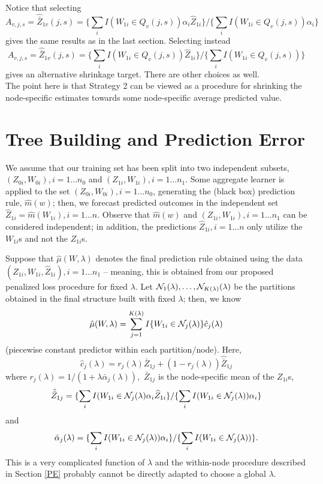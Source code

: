 \documentclass[12pt]{article}
\begin{document}
Notice that selecting
\[
A_{v,j,s} = \hat{\bar{Z}}_{1v}(j,s) =
\{ \sum_i I(W_{1i} \in Q_{v}(j,s)) \alpha_i  \hat{Z}_{1i} \}
/ \{ \sum_i I(W_{1i} \in Q_{v}(j,s)) \alpha_i \}
\]
gives the same results as in the last section. Selecting instead
\[
A_{v,j,s} = \hat{\bar{Z}}_{1v}(j,s) =
\{ \sum_i I(W_{1i} \in Q_{v}(j,s))  \hat{Z}_{1i} \}
/ \{ \sum_i I(W_{1i} \in Q_{v}(j,s))  \}
\]
gives an alternative shrinkage target.  There are other choices as well.\\

The point here is that Strategy 2 can be viewed as a procedure for
shrinking the node-specific estimates towards some node-specific
average predicted value.

\section{Tree Building and Prediction Error}
\label{PE-tree}

We assume that our training set has been split into two independent subsets,
$(Z_{0i},W_{0i}), i = 1 \ldots n_0$ and $(Z_{1i}, W_{1i}), i = 1
\ldots n_1$. Some aggregate learner is applied to 
the set $(Z_{0i}, W_{0i}), i = 1 \ldots
n_0$, generating the (black box) prediction rule, $\hat{m}(w)$; then,
we forecast predicted outcomes in the independent set $\widehat{Z}_{1i} =
\hat{m}(W_{1i}), i = 1 \ldots n$.  Observe that $\hat{m}(w)$ and
$(Z_{1i}, W_{1i}), i = 1 \ldots n_1$ can be considered independent; in
addition, the predictions $\widehat{Z}_{1i}, i = 1 \ldots n$ only
utilize the $W_{1i}$s and not the $Z_{1i}$s. 

Suppose that $\hat{\mu}(W,\lambda)$ denotes the final prediction
rule obtained using the data $(Z_{1i}, W_{1i}, \hat Z_{1i}), i = 1
\ldots n_1$ -- meaning, this is obtained from our proposed
penalized loss procedure for fixed $\lambda.$
Let ${\cal N}_1(\lambda), \ldots, {\cal N}_{K(\lambda)}(\lambda)$ be the
partitions obtained in the final structure built with fixed $\lambda$; 
then, we know
\[
\hat{\mu}(W,\lambda) = \sum_{j=1}^{K(\lambda)} I\{W_{1i} \in {\cal
  N}_j(\lambda)\} \hat c_j(\lambda)
\]
(piecewise constant predictor within each partition/node).  Here,
 \[
\hat{c}_{j}(\lambda) =
r_{j}(\lambda) \bar{Z}_{1j} + (1-r_j(\lambda)) \hat{\bar{Z}}_{1j}
\]
where $r_j(\lambda) = 1/(1 + \lambda \bar{\alpha}_j(\lambda)),$ 
$\bar{Z}_{1j}$ is the node-specific mean
of the $Z_{1i}$s,
\[
\hat{\bar{Z}}_{1j}=
\{ \sum_i I(W_{1i} \in {\cal N}_j(\lambda) \alpha_i  \widehat{Z}_{1i}  \}
/ \{ \sum_i I(W_{1i} \in {\cal N}_j(\lambda)) \alpha_i \}
\]
and
\[
\bar{\alpha}_{j}(\lambda) =  \{ \sum_i I(W_{1i} \in  {\cal N}_j(\lambda)) \alpha_i \} /
\{ \sum_i I(W_{1i} \in  {\cal N}_j(\lambda))  \}. 
\]
This is a very complicated function of $\lambda$ and the within-node
procedure described in Section \ref{PE} probably cannot be directly
adapted to choose a global $\lambda$.
\end{document}
